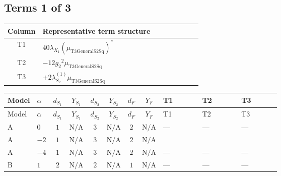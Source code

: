 \documentclass[8pt]{article}
\begin{document}
\begin{landscape}
\subsection*{Terms 1 of 3}
\begin{center}
\begin{tabular}{@{}c >{\raggedright\arraybackslash}p{0.82\linewidth}@{}}
\toprule
Column & Representative term structure \\
\midrule
T1 & \(\displaystyle 40 {\lambda_{X_{1}}} \left({\mu_{\mathrm{T3GeneralS2Sq}}}\right)^{*}\) \\
\midrule
T2 & \(\displaystyle -12 {g_2}^2 {\mu_{\mathrm{T3GeneralS2Sq}}}\) \\
\midrule
T3 & \(\displaystyle +2 {\lambda_{S_2}^{(1)}} {\mu_{\mathrm{T3GeneralS2Sq}}}\) \\
\midrule
\bottomrule
\end{tabular}
\end{center}
\smallskip
\tiny
\begin{longtable}{@{}llcccccc >{\raggedright\arraybackslash}p{0.21\linewidth} >{\raggedright\arraybackslash}p{0.21\linewidth} >{\raggedright\arraybackslash}p{0.21\linewidth}@{}}
\toprule
Model & $\alpha$ & $d_{S_1}$ & $Y_{S_1}$ & $d_{S_2}$ & $Y_{S_2}$ & $d_F$ & $Y_F$ & T1 & T2 & T3 \\
\midrule
\endfirsthead
\toprule
Model & $\alpha$ & $d_{S_1}$ & $Y_{S_1}$ & $d_{S_2}$ & $Y_{S_2}$ & $d_F$ & $Y_F$ & T1 & T2 & T3 \\
\midrule
\endhead
A & $0$ & $1$ & $\text{N/A}$ & $3$ & $\text{N/A}$ & $2$ & $\text{N/A}$ & --- & --- & --- \\
\midrule
A & $-2$ & $1$ & $\text{N/A}$ & $3$ & $\text{N/A}$ & $2$ & $\text{N/A}$ & \scriptsize\adjustbox{max width=\linewidth}{$\begin{gathered} 40 {\lambda_{X_{1}}} \left({\mu_{\mathrm{T3GeneralS2Sq}}}\right)^{*}\end{gathered}$} & \scriptsize\adjustbox{max width=\linewidth}{$\begin{gathered} -12 {g_2}^2 {\mu_{\mathrm{T3GeneralS2Sq}}}\end{gathered}$} & \scriptsize\adjustbox{max width=\linewidth}{$\begin{gathered} +2 {\lambda_{S_2}^{(1)}} {\mu_{\mathrm{T3GeneralS2Sq}}}\end{gathered}$} \\
\midrule
A & $-4$ & $1$ & $\text{N/A}$ & $3$ & $\text{N/A}$ & $2$ & $\text{N/A}$ & --- & --- & --- \\
\midrule
B & $1$ & $2$ & $\text{N/A}$ & $2$ & $\text{N/A}$ & $1$ & $\text{N/A}$ & --- & --- & --- \\

\end{longtable}
\end{landscape}
\end{document}
